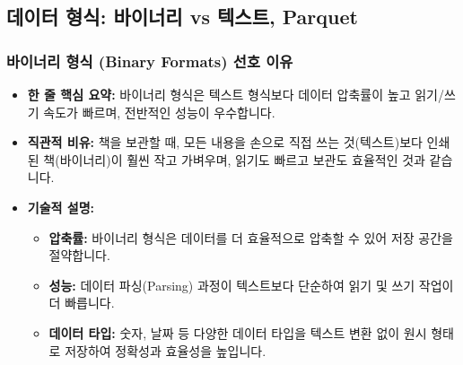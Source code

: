 \documentclass[11pt,a4paper]{article}
\theoremstyle{definition}
\begin{document}
\subsection{데이터 형식: 바이너리 vs 텍스트, Parquet}

\subsubsection{바이너리 형식 (Binary Formats) 선호 이유}
\begin{itemize}
    \item \textbf{한 줄 핵심 요약:} 바이너리 형식은 텍스트 형식보다 데이터 압축률이 높고 읽기/쓰기 속도가 빠르며, 전반적인 성능이 우수합니다.
    \item \textbf{직관적 비유:} 책을 보관할 때, 모든 내용을 손으로 직접 쓰는 것(텍스트)보다 인쇄된 책(바이너리)이 훨씬 작고 가벼우며, 읽기도 빠르고 보관도 효율적인 것과 같습니다.
    \item \textbf{기술적 설명:}
    \begin{itemize}
        \item \textbf{압축률:} 바이너리 형식은 데이터를 더 효율적으로 압축할 수 있어 저장 공간을 절약합니다.
        \item \textbf{성능:} 데이터 파싱(Parsing) 과정이 텍스트보다 단순하여 읽기 및 쓰기 작업이 더 빠릅니다.
        \item \textbf{데이터 타입:} 숫자, 날짜 등 다양한 데이터 타입을 텍스트 변환 없이 원시 형태로 저장하여 정확성과 효율성을 높입니다.
    \end{itemize}
\end{itemize}
\end{document}
